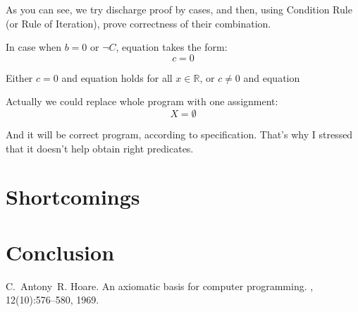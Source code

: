 \documentclass[twoside,twocolumn]{article}
\begin{document}
As you can see, we try discharge proof by cases, and then, using Condition
Rule (or Rule of Iteration), prove correctness of their combination.

In case when $b = 0$ or $\neg C$, equation takes the form:
$$ c = 0$$

Either $c = 0$ and equation holds for all $x \in \mathbb{R}$, or $c \neq 0$ and
equation 


Actually we could replace whole program with one assignment:
$$ X = \emptyset $$

And it will be correct program, according to specification. That's why I
stressed that it doesn't help obtain right predicates. 













\section{Shortcomings}

\section{Conclusion}

\begin{thebibliography}{99} %

C.~Antony~R. Hoare.
\newblock An axiomatic basis for computer programming.
, 12(10):576--580, 1969.

\end{thebibliography}

\end{document}
